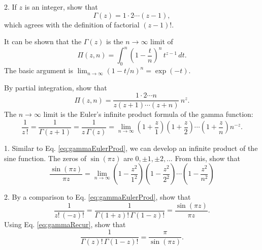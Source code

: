 \documentclass{book}
\begin{document}

2. If $z$ is an integer, show that
\[
  \Gamma(z) = 1 \cdot 2 \cdots (z - 1),
\]
which agrees with the definition of factorial $(z-1)!$.






It can be shown\cite{whittaker} that the $\Gamma(z)$
is the $n\rightarrow \infty$ limit of
\begin{equation}
  \Pi(z, n)
=
  \int_0^n
  \left(
    1 - \frac t n
  \right)^n \,
  t^{z-1} \,
  d t.
\label{eq:gammaPi}
\end{equation}
The basic argument is
$\lim_{n \rightarrow \infty} (1 - t/n)^n = \exp(-t)$.

By partial integration, show that
\[
  \Pi(z, n)
=
  \frac{ 1 \cdot 2 \cdots n }
  { z (z + 1) \cdots (z + n) }
  \, n^z.
\]
The $n \rightarrow \infty$ limit is
the Euler's infinite product formula of the gamma function:
\begin{equation}
  \frac 1 {z\,!}
=
  \frac 1 {\Gamma(z + 1)}
=
  \frac 1 {z \, \Gamma(z)}
=
  \lim_{n \rightarrow \infty}
  \left( 1 + \frac z 1 \right)
  \left( 1 + \frac z 2 \right)
  \cdots
  \left( 1 + \frac z n \right)
  n^{-z}.
  \label{eq:gammaEulerProd}
\end{equation}






1. Similar to Eq. \eqref{eq:gammaEulerProd},
we can develop an infinite product of the sine function.
%
The zeros of $\sin(\pi z)$ are $0, \pm 1, \pm 2, \dots$
%
From this, show that
\begin{equation}
  \frac { \sin( \pi z ) } { \pi z }
=
  \lim_{n \rightarrow \infty}
  \left( 1 - \frac {z^2} {1^2} \right)
  \left( 1 - \frac {z^2} {2^2} \right)
  \cdots
  \left( 1 - \frac {z^2} {n^2} \right)
  \label{eq:sin_infprod}
\end{equation}

2. By a comparison to Eq. \eqref{eq:gammaEulerProd},
show that
\begin{equation}
  \frac 1 {z! \, (-z)!}
=
  \frac 1 {\Gamma(1+z)! \, \Gamma(1-z)!}
=
  \frac { \sin( \pi z ) } { \pi z }.
  \label{eq:gammasin}
\end{equation}
%
Using Eq. \eqref{eq:gammaRecur}, show that
\begin{equation}
  \frac 1 {\Gamma(z)! \, \Gamma(1-z)!}
=
  \frac { \pi } { \sin( \pi z ) }.
  \label{eq:gammasin}
\end{equation}
\end{document}
